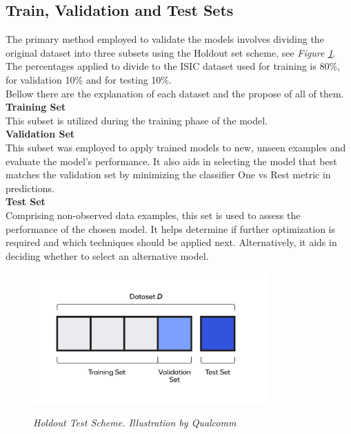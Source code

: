 \subsection{Train, Validation and Test Sets}

The primary method employed to validate the models involves dividing the original dataset into three subsets using the Holdout set scheme, see \textit{Figure \ref{fig:holdout-test-scheme}}. The percentages applied to divide to the ISIC dataset used for training is 80\%, for validation 10\% and for testing 10\%. \\

Bellow there are the explanation of each dataset and the propose of all of them. \\

\vspace{0.5cm}
\textbf{Training Set} \\

This subset is utilized during the training phase of the model. \\

\vspace{0.5cm}
\textbf{Validation Set} \\

This subset was employed to apply trained models to new, unseen examples and evaluate the model's performance. It also aids in selecting the model that best matches the validation set by minimizing the classifier One vs Rest metric in predictions. \\

\vspace{0.5cm}
\textbf{Test Set} \\

Comprising non-observed data examples, this set is used to assess the performance of the chosen model. It helps determine if further optimization is required and which techniques should be applied next. Alternatively, it aids in deciding whether to select an alternative model. 


\begin{figure}[H]
\centering
\includegraphics[width=0.8\textwidth]{imatges/preliminaries/train-test-validation-sets.png}
\caption[Holdout Test Scheme]{\textit{Holdout Test Scheme. Illustration by Qualcomm}}
{\label{fig:holdout-test-scheme}}
\end{figure}

